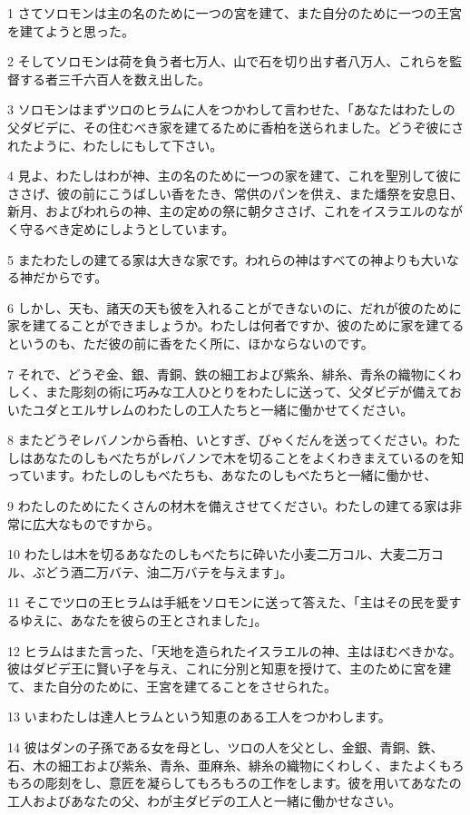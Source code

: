 \par 1 さてソロモンは主の名のために一つの宮を建て、また自分のために一つの王宮を建てようと思った。
\par 2 そしてソロモンは荷を負う者七万人、山で石を切り出す者八万人、これらを監督する者三千六百人を数え出した。
\par 3 ソロモンはまずツロのヒラムに人をつかわして言わせた、「あなたはわたしの父ダビデに、その住むべき家を建てるために香柏を送られました。どうぞ彼にされたように、わたしにもして下さい。
\par 4 見よ、わたしはわが神、主の名のために一つの家を建て、これを聖別して彼にささげ、彼の前にこうばしい香をたき、常供のパンを供え、また燔祭を安息日、新月、およびわれらの神、主の定めの祭に朝夕ささげ、これをイスラエルのながく守るべき定めにしようとしています。
\par 5 またわたしの建てる家は大きな家です。われらの神はすべての神よりも大いなる神だからです。
\par 6 しかし、天も、諸天の天も彼を入れることができないのに、だれが彼のために家を建てることができましょうか。わたしは何者ですか、彼のために家を建てるというのも、ただ彼の前に香をたく所に、ほかならないのです。
\par 7 それで、どうぞ金、銀、青銅、鉄の細工および紫糸、緋糸、青糸の織物にくわしく、また彫刻の術に巧みな工人ひとりをわたしに送って、父ダビデが備えておいたユダとエルサレムのわたしの工人たちと一緒に働かせてください。
\par 8 またどうぞレバノンから香柏、いとすぎ、びゃくだんを送ってください。わたしはあなたのしもべたちがレバノンで木を切ることをよくわきまえているのを知っています。わたしのしもべたちも、あなたのしもべたちと一緒に働かせ、
\par 9 わたしのためにたくさんの材木を備えさせてください。わたしの建てる家は非常に広大なものですから。
\par 10 わたしは木を切るあなたのしもべたちに砕いた小麦二万コル、大麦二万コル、ぶどう酒二万バテ、油二万バテを与えます」。
\par 11 そこでツロの王ヒラムは手紙をソロモンに送って答えた、「主はその民を愛するゆえに、あなたを彼らの王とされました」。
\par 12 ヒラムはまた言った、「天地を造られたイスラエルの神、主はほむべきかな。彼はダビデ王に賢い子を与え、これに分別と知恵を授けて、主のために宮を建て、また自分のために、王宮を建てることをさせられた。
\par 13 いまわたしは達人ヒラムという知恵のある工人をつかわします。
\par 14 彼はダンの子孫である女を母とし、ツロの人を父とし、金銀、青銅、鉄、石、木の細工および紫糸、青糸、亜麻糸、緋糸の織物にくわしく、またよくもろもろの彫刻をし、意匠を凝らしてもろもろの工作をします。彼を用いてあなたの工人およびあなたの父、わが主ダビデの工人と一緒に働かせなさい。
